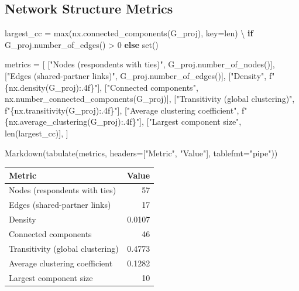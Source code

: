 \documentclass[
  letterpaper,
  DIV=11,
  numbers=noendperiod]{scrartcl}
\newenvironment{Shaded}{\begin{snugshade}}{\end{snugshade}}
\newcommand{\BuiltInTok}[1]{\textcolor[rgb]{0.00,0.23,0.31}{#1}}
\newcommand{\ControlFlowTok}[1]{\textcolor[rgb]{0.00,0.23,0.31}{\textbf{#1}}}
\newcommand{\DecValTok}[1]{\textcolor[rgb]{0.68,0.00,0.00}{#1}}
\newcommand{\NormalTok}[1]{\textcolor[rgb]{0.00,0.23,0.31}{#1}}
\newcommand{\OperatorTok}[1]{\textcolor[rgb]{0.37,0.37,0.37}{#1}}
\newcommand{\SpecialCharTok}[1]{\textcolor[rgb]{0.37,0.37,0.37}{#1}}
\newcommand{\SpecialStringTok}[1]{\textcolor[rgb]{0.13,0.47,0.30}{#1}}
\newcommand{\StringTok}[1]{\textcolor[rgb]{0.13,0.47,0.30}{#1}}
\begin{document}
\subsection{Network Structure Metrics}\label{network-structure-metrics}

\begin{Shaded}
\begin{Highlighting}[]
\NormalTok{largest\_cc }\OperatorTok{=} \BuiltInTok{max}\NormalTok{(nx.connected\_components(G\_proj), key}\OperatorTok{=}\BuiltInTok{len}\NormalTok{) }\OperatorTok{\textbackslash{}}
    \ControlFlowTok{if}\NormalTok{ G\_proj.number\_of\_edges() }\OperatorTok{\textgreater{}} \DecValTok{0} \ControlFlowTok{else} \BuiltInTok{set}\NormalTok{()}

\NormalTok{metrics }\OperatorTok{=}\NormalTok{ [}
\NormalTok{    [}\StringTok{"Nodes (respondents with ties)"}\NormalTok{, G\_proj.number\_of\_nodes()],}
\NormalTok{    [}\StringTok{"Edges (shared{-}partner links)"}\NormalTok{, G\_proj.number\_of\_edges()],}
\NormalTok{    [}\StringTok{"Density"}\NormalTok{, }\SpecialStringTok{f"}\SpecialCharTok{\{}\NormalTok{nx}\SpecialCharTok{.}\NormalTok{density(G\_proj)}\SpecialCharTok{:.4f\}}\SpecialStringTok{"}\NormalTok{],}
\NormalTok{    [}\StringTok{"Connected components"}\NormalTok{, nx.number\_connected\_components(G\_proj)],}
\NormalTok{    [}\StringTok{"Transitivity (global clustering)"}\NormalTok{,}
     \SpecialStringTok{f"}\SpecialCharTok{\{}\NormalTok{nx}\SpecialCharTok{.}\NormalTok{transitivity(G\_proj)}\SpecialCharTok{:.4f\}}\SpecialStringTok{"}\NormalTok{],}
\NormalTok{    [}\StringTok{"Average clustering coefficient"}\NormalTok{,}
     \SpecialStringTok{f"}\SpecialCharTok{\{}\NormalTok{nx}\SpecialCharTok{.}\NormalTok{average\_clustering(G\_proj)}\SpecialCharTok{:.4f\}}\SpecialStringTok{"}\NormalTok{],}
\NormalTok{    [}\StringTok{"Largest component size"}\NormalTok{, }\BuiltInTok{len}\NormalTok{(largest\_cc)],}
\NormalTok{]}

\NormalTok{Markdown(tabulate(metrics, headers}\OperatorTok{=}\NormalTok{[}\StringTok{"Metric"}\NormalTok{, }\StringTok{"Value"}\NormalTok{],}
\NormalTok{                  tablefmt}\OperatorTok{=}\StringTok{"pipe"}\NormalTok{))}
\end{Highlighting}
\end{Shaded}

\label{network-metrics}
\begin{longtable}[]{@{}lr@{}}
\toprule\noalign{}
Metric & Value \\
\midrule\noalign{}
\endhead
\bottomrule\noalign{}
\endlastfoot
Nodes (respondents with ties) & 57 \\
Edges (shared-partner links) & 17 \\
Density & 0.0107 \\
Connected components & 46 \\
Transitivity (global clustering) & 0.4773 \\
Average clustering coefficient & 0.1282 \\
Largest component size & 10 \\
\end{longtable}
\end{document}
